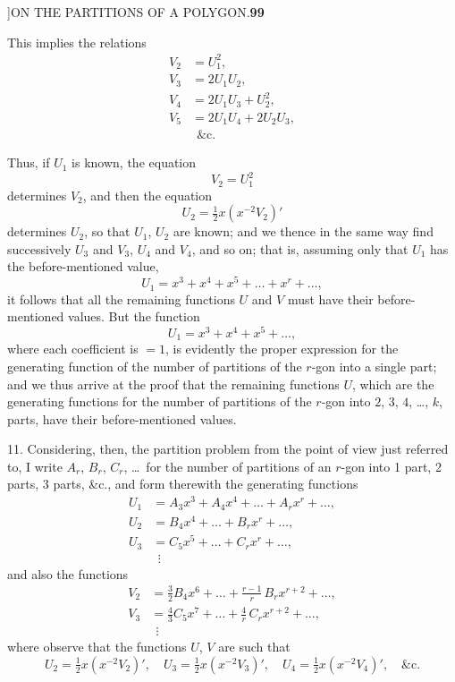 \documentclass[11pt]{article}
\begin{document}
\newpage
{}]\hfill ON THE PARTITIONS OF A POLYGON.\hfill\textbf{99}

\smallskip
This implies the relations
\[
\begin{aligned}
V_{2} &= U_{1}^{2},\\
V_{3} &= 2U_{1}U_{2},\\
V_{4} &= 2U_{1}U_{3}+U_{2}^{2},\\
V_{5} &= 2U_{1}U_{4}+2U_{2}U_{3},\\
&\ \ \&\text{c.}
\end{aligned}
\]

\hspace{1em} Thus, if $U_{1}$ is known, the equation
\[
V_{2}=U_{1}^{2}
\]
determines $V_{2}$, and then the equation
\[
U_{2}=\tfrac{1}{2}x(x^{-2}V_{2})'
\]
determines $U_{2}$, so that $U_{1}$, $U_{2}$ are known; and we thence in the
same way find successively $U_{3}$ and $V_{3}$, $U_{4}$ and $V_{4}$, and so
on; that is, assuming only that $U_{1}$ has the before-mentioned value,
\[
U_{1}=x^{3}+x^{4}+x^{5}+\ldots+x^{r}+\ldots,
\]
it follows that all the remaining functions $U$ and $V$ must have their
before-mentioned values. But the function
\[
U_{1}=x^{3}+x^{4}+x^{5}+\ldots,
\]
where each coefficient is $=1$, is evidently the proper expression for the
generating function of the number of partitions of the $r$-gon into a single
part; and we thus arrive at the proof that the remaining functions $U$, which
are the generating functions for the number of partitions of the $r$-gon
into $2$, $3$, $4$, \ldots, $k$, parts, have their before-mentioned values.

\hspace{1em} 11. Considering, then, the partition problem from the point of
view just referred to, I write $A_{r}$, $B_{r}$, $C_{r}$, \ldots\ for the
number of partitions of an $r$-gon into 1 part, 2 parts, 3 parts, \&c., and
form therewith the generating functions
\[
\begin{aligned}
U_{1} &= A_{3}x^{3}+A_{4}x^{4}+\ldots+A_{r}x^{r}+\ldots,\\
U_{2} &= B_{4}x^{4}+\ldots+B_{r}x^{r}+\ldots,\\
U_{3} &= C_{5}x^{5}+\ldots+C_{r}x^{r}+\ldots,\\
&\ \ \vdots
\end{aligned}
\]
and also the functions
\[
\begin{aligned}
V_{2} &= \tfrac{3}{2}B_{4}x^{6}+\ldots+\tfrac{r-1}{r}\,B_{r}x^{r+2}+\ldots,\\
V_{3} &= \tfrac{4}{3}C_{5}x^{7}+\ldots+\tfrac{4}{r}\,C_{r}x^{r+2}+\ldots,\\
&\ \ \vdots
\end{aligned}
\]
where observe that the functions $U$, $V$ are such that
\[
U_{2}=\tfrac{1}{2}x(x^{-2}V_{2})',\quad U_{3}=\tfrac{1}{2}x(x^{-2}V_{3})',\quad
U_{4}=\tfrac{1}{2}x(x^{-2}V_{4})',\quad\&\text{c.}
\]
\end{document}
